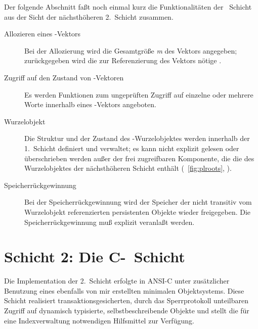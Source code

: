 %
Der folgende Abschnitt fa\ss{}t noch einmal kurz die Funktionalit\"{a}ten
der \postore\ Schicht aus der Sicht der n\"{a}chsth\"{o}heren 2.~Schicht
zusammen.
\begin{description}
%
\item[Allozieren eines \postore-Vektors]
Bei der Allozierung wird die Gesamtgr\"{o}\ss{}e {\it m} des Vektors
angegeben; zur\"{u}ckgegeben wird die zur Referenzierung des Vektors
n\"{o}tige \lobjid.
%
\item[Zugriff auf den Zustand von \postore-Vektoren]
Es werden Funktionen zum un\-ge\-pr\"{u}f\-ten Zugriff auf
einzelne oder mehrere Worte innerhalb eines \postore-Vektors
angeboten.
%
\item[Wurzelobjekt]
Die Struktur und der Zustand des \postore-Wurzelobjektes werden
innerhalb der 1.~Schicht definiert und verwaltet; es kann nicht
explizit gelesen oder \"{u}berschrieben werden au\ss{}er der frei
zugreifbaren Komponente, die die \lobjid\/ des Wurzelobjektes der
n\"{a}chsth\"{o}heren Schicht enth\"{a}lt (\figurename~\ref{fig:plroots},
\citepage{\pageref{fig:plroots}}).
%
\item[Speicherr\"{u}ckgewinnung]
Bei der Speicherr\"{u}ckgewinnung wird der Speicher der nicht transitiv
vom Wurzelobjekt referenzierten persistenten Objekte wieder
freigegeben. Die Speicherr\"{u}ckgewinnung mu\ss{} explizit veranla\ss{}t
werden.
%
\end{description}
%
\section{Schicht 2: Die C-\protect\plob\ Schicht}
%
Die Implementation der 2.~Schicht erfolgte in ANSI-C unter
zu\-s\"{a}tz\-li\-cher Benutzung eines ebenfalls von mir erstellten
minimalen Objektsystems. Diese Schicht realisiert
transaktionsgesicherten, durch das Sperrprotokoll unteilbaren Zugriff
auf dynamisch typisierte, selbstbeschreibende Objekte und stellt die
f\"{u}r eine Indexverwaltung notwendigen Hilfsmittel zur Verf\"{u}gung.
%
